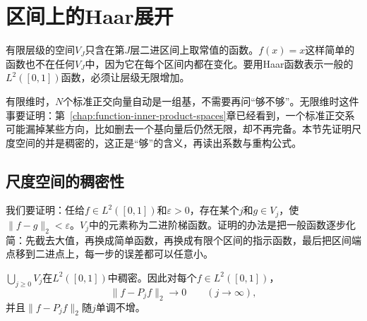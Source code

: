 \section{区间上的Haar展开}
\label{sec:wavelet-interval-expansion}

有限层级的空间$V_J$只含在第$J$层二进区间上取常值的函数。$f(x)=x$这样简单的函数也不在任何$V_J$中，因为它在每个区间内都在变化。要用Haar函数表示一般的$L^2([0,1])$函数，必须让层级无限增加。

有限维时，$N$个标准正交向量自动是一组基，不需要再问“够不够”。无限维时这件事要证明：第~\ref{chap:function-inner-product-spaces}章已经看到，一个标准正交系可能漏掉某些方向，比如删去一个基向量后仍然无限，却不再完备。本节先证明尺度空间的并是稠密的，这正是“够”的含义，再读出系数与重构公式。

\subsection{尺度空间的稠密性}
\label{sec:wavelet-scaling-density}

我们要证明：任给$f\in L^2([0,1])$和$\varepsilon>0$，存在某个$j$和$g\in V_j$，使$\lVert f-g\rVert_2<\varepsilon$。$V_j$中的元素称为二进阶梯函数。证明的办法是把一般函数逐步化简：先截去大值，再换成简单函数，再换成有限个区间的指示函数，最后把区间端点移到二进点上，每一步的误差都可以任意小。

\begin{theorem}[二进阶梯函数的稠密性]
\label{thm:wavelet-dyadic-dense}
$\bigcup_{j\geq0}V_j$在$L^2([0,1])$中稠密。因此对每个$f\in L^2([0,1])$，
\begin{equation}
 \lVert f-P_jf\rVert_2\to0\qquad(j\to\infty),
 \label{eq:wavelet-dense-convergence}
\end{equation}
并且$\lVert f-P_jf\rVert_2$随$j$单调不增。
\end{theorem}

